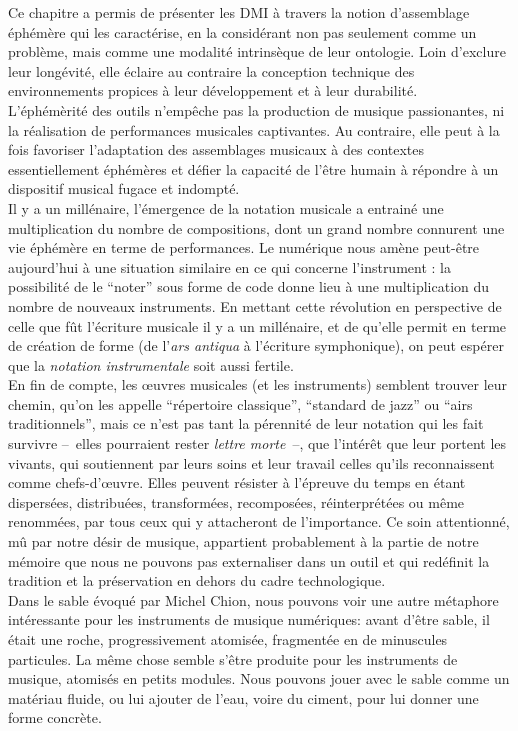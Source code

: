\noindent Ce chapitre a permis de présenter les \gls{DMI} à travers la notion d'assemblage éphémère qui les caractérise, en la considérant non pas seulement comme un problème, mais comme une modalité intrinsèque de leur ontologie. Loin d'exclure leur longévité, elle éclaire au contraire la conception technique des environnements propices à leur développement et à leur durabilité.\\
\indent L'éphémèrité des outils n'empêche pas la production de musique passionantes, ni la réalisation de performances musicales captivantes. Au contraire, elle peut à la fois favoriser l'adaptation des assemblages musicaux à des contextes essentiellement éphémères et défier la capacité de l'être humain à répondre à un dispositif musical fugace et indompté.\\
\indent Il y a un millénaire, l'émergence de la notation musicale a entrainé une multiplication du nombre de compositions, dont un grand nombre connurent une vie éphémère en terme de performances. Le numérique nous amène peut-être aujourd'hui à une situation similaire en ce qui concerne l'instrument : la possibilité de le ``noter'' sous forme de code donne lieu à une multiplication du nombre de nouveaux instruments. En mettant cette révolution en perspective de celle que fût l'écriture musicale il y a un millénaire, et de qu'elle permit en terme de création de forme (de l'\textit{ars antiqua} à l'écriture symphonique), on peut espérer que la \textit{notation instrumentale} soit aussi fertile.\\
\indent En fin de compte, les œuvres musicales (et les instruments) semblent trouver leur chemin, qu'on les appelle ``répertoire classique'', ``standard de jazz'' ou ``airs traditionnels'', mais ce n'est pas tant la pérennité de leur notation qui les fait survivre --~elles pourraient rester \textit{lettre morte}~--, que l'intérêt que leur portent les vivants, qui soutiennent par leurs soins et leur travail celles qu'ils reconnaissent comme chefs-d'œuvre. Elles peuvent résister à l'épreuve du temps en étant dispersées, distribuées, transformées, recomposées, réinterprétées ou même renommées, par tous ceux qui y attacheront de l'importance. Ce soin attentionné, mû par notre désir de musique, appartient probablement à la partie de notre mémoire que nous ne pouvons pas externaliser dans un outil et qui redéfinit la tradition et la préservation en dehors du cadre technologique.\\
\indent Dans le sable évoqué par Michel Chion, nous pouvons voir une autre métaphore intéressante pour les instruments de musique numériques: avant d'être sable, il était une roche, progressivement atomisée, fragmentée en de minuscules particules. La même chose semble s'être produite pour les instruments de musique, atomisés en petits modules. Nous pouvons jouer avec le sable comme un matériau fluide, ou lui ajouter de l'eau, voire du ciment, pour lui donner une forme concrète.\\
